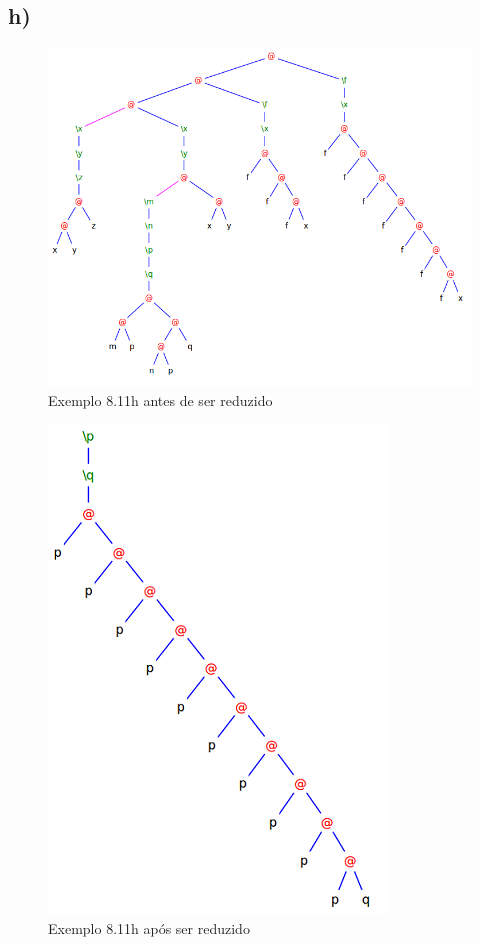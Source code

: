 \documentclass[a4paper]{article}
\begin{document}
\FloatBarrier

\subsection*{h)}

\begin{figure}[h]
  \centering
  \includegraphics[scale=0.5]{8-11h_1.png}
  \caption{Exemplo 8.11h antes de ser reduzido}
\end{figure}

\begin{figure}[h]
  \centering
  \includegraphics[scale=0.5]{8-11h_2.png}
  \caption{Exemplo 8.11h após  ser reduzido}
\end{figure}

\FloatBarrier
\end{document}
